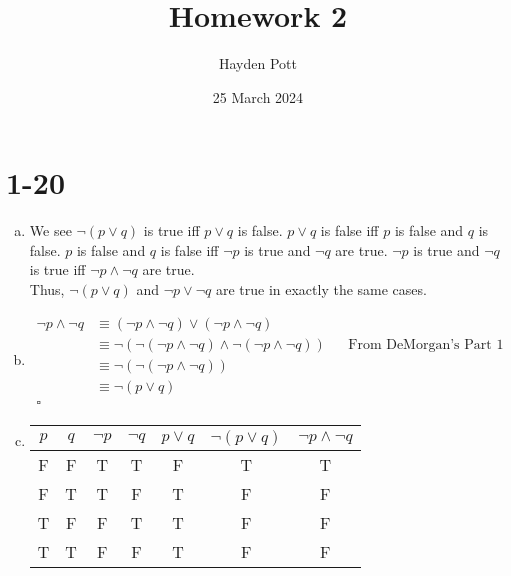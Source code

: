 \documentclass{article}
\begin{document}
\title{Homework 2}
\author{Hayden Pott}
\date{25 March 2024}

\section{1-20}
    \begin{enumerate}[a)]

    \item We see $\neg(p \lor q)$ is true iff $p \lor q$ is false.  $p \lor q$ is
        false iff $p$ is false and $q$ is false.  $p$ is false and $q$ is false
        iff $\neg p$ is true and $\neg q$ are true.  $\neg p$ is true and $\neg
        q$ is true iff $\neg p \land \neg q$ are true. \\
        Thus, $\neg(p \lor q)$ and $\neg p \lor \neg q$ are true in exactly the same cases.

    \item
        \begin{align*}
            \neg p \land \neg q &\equiv (\neg p \land \neg q) \lor (\neg p \land \neg q) \\
            &\equiv \neg(\neg(\neg p\land \neg q) \land \neg(\neg p \land \neg q)) && \text{From DeMorgan's Part 1} \\
            &\equiv \neg(\neg(\neg p \land \neg q)) \\
            &\equiv \neg(p \lor q) \\
            \square
        \end{align*}

    \item
        \begin{tabular}{ |c|c|c|c|c|c|c| }
        \hline
        $p$   & $q$ & $\neg p$ & $\neg q$ & $p \lor q$ & $\neg(p \lor q)$ & $\neg p \land \neg q$ \\
        \hline
            F & F   & T        & T        & F          & T                & T                     \\
            F & T   & T        & F        & T          & F                & F                     \\
            T & F   & F        & T        & T          & F                & F                     \\
            T & T   & F        & F        & T          & F                & F                     \\
        \hline
        \end{tabular}
    \end{enumerate}
\end{document}
